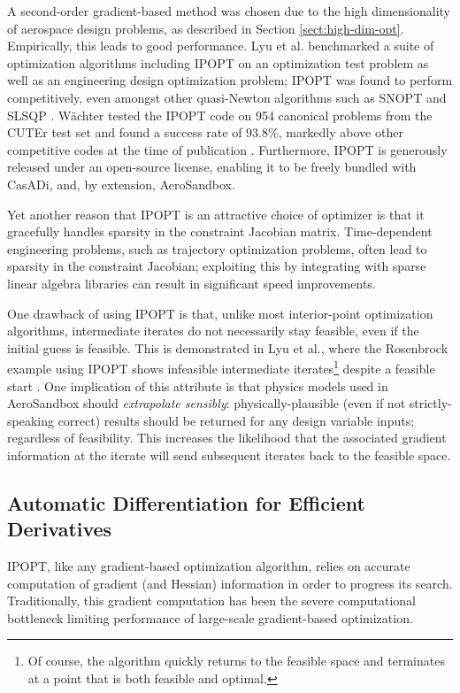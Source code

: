 A second-order gradient-based method was chosen due to the high dimensionality of aerospace design problems, as described in Section \ref{sect:high-dim-opt}. Empirically, this leads to good performance. Lyu et al. benchmarked a suite of optimization algorithms including IPOPT on an optimization test problem as well as an engineering design optimization problem; IPOPT was found to perform competitively, even amongst other quasi-Newton algorithms such as SNOPT and SLSQP \cite{lyu2014}. Wächter tested the IPOPT code on 954 canonical problems from the CUTEr test set and found a success rate of 93.8\%, markedly above other competitive codes at the time of publication \cite{ipopt}. Furthermore, IPOPT is generously released under an open-source license, enabling it to be freely bundled with CasADi, and, by extension, AeroSandbox.

Yet another reason that IPOPT is an attractive choice of optimizer is that it gracefully handles sparsity in the constraint Jacobian matrix. Time-dependent engineering problems, such as trajectory optimization problems, often lead to sparsity in the constraint Jacobian; exploiting this by integrating with sparse linear algebra libraries can result in significant speed improvements.


One drawback of using IPOPT is that, unlike most interior-point optimization algorithms, intermediate iterates do not necessarily stay feasible, even if the initial guess is feasible. This is demonstrated in Lyu et al., where the Rosenbrock example using IPOPT shows infeasible intermediate iterates\footnote{Of course, the algorithm quickly returns to the feasible space and terminates at a point that is both feasible and optimal.} despite a feasible start \cite{lyu2014}. One implication of this attribute is that physics models used in AeroSandbox should \textit{extrapolate sensibly}: physically-plausible (even if not strictly-speaking correct) results should be returned for any design variable inputs; regardless of feasibility. This increases the likelihood that the associated gradient information at the iterate will send subsequent iterates back to the feasible space.

\subsection{Automatic Differentiation for Efficient Derivatives}
\label{sect:ad}

IPOPT, like any gradient-based optimization algorithm, relies on accurate computation of gradient (and Hessian) information in order to progress its search. Traditionally, this gradient computation has been the severe computational bottleneck limiting performance of large-scale gradient-based optimization.

